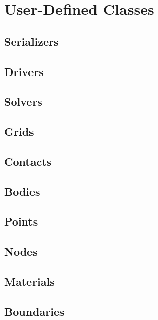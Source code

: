 \chapter{User-Defined Classes} \label{scn:udc}
\section{Serializers} \label{scn:serializers}

\section{Drivers} \label{scn:drivers}

\section{Solvers} \label{scn:solvers}

\section{Grids} \label{scn:grids}

\section{Contacts} \label{scn:contacts}

\section{Bodies} \label{scn:bodies}

\section{Points} \label{scn:points}

\section{Nodes} \label{scn:nodes}

\section{Materials} \label{scn:materials}

\section{Boundaries} \label{scn:boundaries}